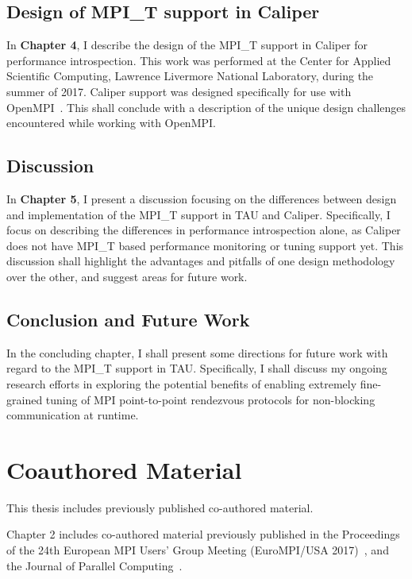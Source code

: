 \subsection {Design of MPI\_T support in Caliper}
In \textbf{Chapter 4}, I describe the design of the MPI\_T support in Caliper for performance introspection. This work was performed at the Center for Applied Scientific Computing, Lawrence Livermore National Laboratory, during the summer of 2017. Caliper support was designed specifically for use with OpenMPI~\cite{OpenMPI}. This shall conclude with a description of the unique design challenges encountered while working with OpenMPI.

\subsection {Discussion}
In \textbf{Chapter 5}, I present a discussion focusing on the differences between design and implementation of the MPI\_T support in TAU and Caliper. Specifically, I focus on describing the differences in performance introspection alone, as Caliper does not have MPI\_T based performance monitoring or tuning support yet. This discussion shall highlight the advantages and pitfalls of one design methodology over the other, and suggest areas for future work. 

\subsection {Conclusion and Future Work}
In the concluding chapter, I shall present some directions for future work with regard to the MPI\_T support in TAU. Specifically, I shall discuss my ongoing research efforts in exploring the potential benefits of enabling extremely fine-grained tuning of MPI point-to-point rendezvous protocols for non-blocking communication at runtime.

\section {Coauthored Material}
This thesis includes previously published co-authored material. 
\par Chapter 2 includes co-authored material previously published in the Proceedings of the 24th European MPI Users' Group Meeting (EuroMPI/USA 2017)~\cite{EuroMPI}, and the Journal of Parallel Computing~\cite{ParCo}.
